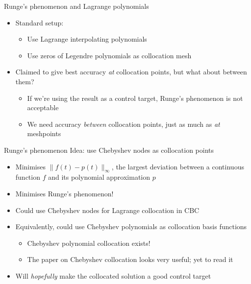 \documentclass[presentation]{beamer}
\begin{document}
\begin{frame}[label={sec:org427d7ea}]{Runge's phenomenon and Lagrange polynomials}
\begin{itemize}
\item Standard setup:
\begin{itemize}
\item Use Lagrange interpolating polynomials
\item Use zeros of Legendre polynomials as collocation mesh
\end{itemize}
\end{itemize}
\vfill
\begin{itemize}
\item Claimed to give best accuracy \emph{at} collocation points, but what about between them?
\begin{itemize}
\item If we're using the result as a control target, Runge's phenomenon is not acceptable
\item We need accuracy \emph{between} collocation points, just as much as \emph{at} meshpoints
\end{itemize}
\end{itemize}
\end{frame}

\begin{frame}[label={sec:org3fd4402}]{Runge's phenomenon}
Idea: use Chebyshev nodes as collocation points
\begin{itemize}
\item Minimises \(\|f(t)-p(t)\|_\infty\), the largest deviation between a continuous function \(f\) and its polynomial approximation \(p\)
\item Minimises Runge's phenomenon!
\item Could use Chebyshev nodes for Lagrange collocation in CBC
\item Equivalently, could use Chebyshev polynomials as collocation basis functions
\begin{itemize}
\item Chebyshev polynomial collocation exists!
\item The paper on Chebyshev collocation looks very useful; yet to read it
\end{itemize}
\item Will \emph{hopefully} make the collocated solution a good control target
\end{itemize}
\end{frame}
\end{document}
